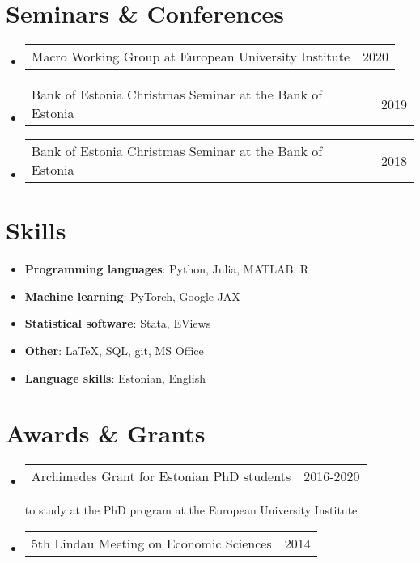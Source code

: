 \documentclass[a4, 11pt]{article}
\makeatletter
\newcommand{\resumeOtherHeading}[2]{
      \item
      \begin{tabularx}{0.97\textwidth}{X@{\extracolsep{2em}}r}
        #1 & #2
      \end{tabularx}
    }
\newcommand{\resumeSubHeadingListStart}{\begin{itemize}[leftmargin=0.15in, label={}]}
\newcommand{\resumeSubHeadingListEnd}{\end{itemize}}
\makeatother
\begin{document}
    \section*{Seminars \& Conferences}
  \resumeSubHeadingListStart
        \resumeOtherHeading
          {{Macro Working Group} at {European University Institute} }
          { 2020 }
        \resumeOtherHeading
          {{Bank of Estonia Christmas Seminar} at {the Bank of Estonia} }
          { 2019 }
        \resumeOtherHeading
          {{Bank of Estonia Christmas Seminar} at {the Bank of Estonia} }
          { 2018 }
    \resumeSubHeadingListEnd

    \section{Skills}\begin{itemize}[leftmargin=0.15in, label = {}]
      \item \small{ \textbf{Programming languages}: Python, Julia, MATLAB, R}
      \item \small{ \textbf{Machine learning}: PyTorch, Google JAX}
      \item \small{ \textbf{Statistical software}: Stata, EViews}
      \item \small{ \textbf{Other}: LaTeX, SQL, git, MS Office}
      \item \small{ \textbf{Language skills}: Estonian, English}
  \end{itemize}

    \section{Awards \& Grants}
  \resumeSubHeadingListStart
        \resumeOtherHeading
          {  {Archimedes Grant for Estonian PhD students}{} }
          { 2016-2020 }
          {to study at the PhD program at the European University Institute}
        \resumeOtherHeading
          {  {5th Lindau Meeting on Economic Sciences}{} }
          { 2014 }
          {}
    \resumeSubHeadingListEnd

    
\end{document}
